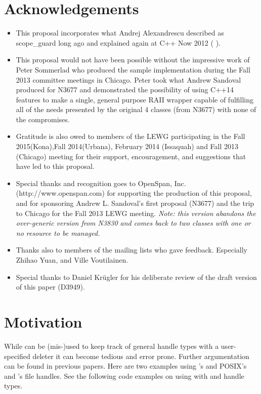 \documentclass[ebook,11pt,article]{memoir}
\begin{document}
\chapter{Acknowledgements}
\begin{itemize}
\item This proposal incorporates what Andrej Alexandrescu described as scope_guard long ago and explained again at C++ Now 2012 (%
).
\item This proposal would not have been possible without the impressive work of Peter Sommerlad who produced the sample implementation during the Fall 2013 committee meetings in Chicago.  Peter took what Andrew Sandoval produced for N3677 and demonstrated the possibility of using C++14 features to make a single, general purpose RAII wrapper capable of fulfilling all of the needs presented by the original 4 classes (from N3677) with none of the compromises.
\item Gratitude is also owed to members of the LEWG participating in the Fall 2015(Kona),Fall 2014(Urbana), February 2014 (Issaquah) and Fall 2013 (Chicago) meeting for their support, encouragement, and suggestions that have led to this proposal.
\item Special thanks and recognition goes to OpenSpan, Inc. (http://www.openspan.com) for supporting the production of this proposal, and for sponsoring Andrew L. Sandoval's first proposal (N3677) and the trip to Chicago for the Fall 2013 LEWG meeting. \emph{Note: this version abandons the over-generic version from N3830 and comes back to two classes with one or no resource to be managed.}
\item Thanks also to members of the mailing lists who gave feedback. Especially Zhihao Yuan, and Ville Voutilainen.
\item Special thanks to Daniel Kr\"ugler for his deliberate review of the draft version of this paper (D3949).
\end{itemize}

\chapter{Motivation}
While  can be (mis-)used to keep track of general handle types with a user-specified deleter it can become tedious and error prone. Further argumentation can be found in previous papers. Here are two examples using  's  and POSIX's and 's  file handles. See the following code examples on using  with  and  handle types.
\end{document}
